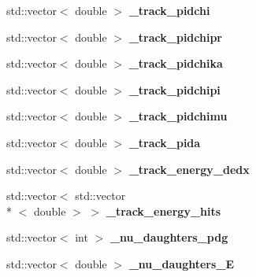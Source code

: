 \begin{DoxyCompactItemize}
\item 
\hypertarget{group__lee_gad41a5c8f9908d57ca71dafdd1acffa77}{std\-::vector$<$ double $>$ {\bfseries \-\_\-track\-\_\-pidchi}}\label{group__lee_gad41a5c8f9908d57ca71dafdd1acffa77}

\item 
\hypertarget{group__lee_gaecf90a4b535a1eea4a2e46efaed73aee}{std\-::vector$<$ double $>$ {\bfseries \-\_\-track\-\_\-pidchipr}}\label{group__lee_gaecf90a4b535a1eea4a2e46efaed73aee}

\item 
\hypertarget{group__lee_gacd3a6086b23d0242a02a1aaafaa22f21}{std\-::vector$<$ double $>$ {\bfseries \-\_\-track\-\_\-pidchika}}\label{group__lee_gacd3a6086b23d0242a02a1aaafaa22f21}

\item 
\hypertarget{group__lee_gaecc3128a6d2e1ce777b2a47cf8d8592e}{std\-::vector$<$ double $>$ {\bfseries \-\_\-track\-\_\-pidchipi}}\label{group__lee_gaecc3128a6d2e1ce777b2a47cf8d8592e}

\item 
\hypertarget{group__lee_ga92b6e7aa446dda4b3fb5ef6a523417d3}{std\-::vector$<$ double $>$ {\bfseries \-\_\-track\-\_\-pidchimu}}\label{group__lee_ga92b6e7aa446dda4b3fb5ef6a523417d3}

\item 
\hypertarget{group__lee_ga51862c538bdadd1819aa4cc47f37daab}{std\-::vector$<$ double $>$ {\bfseries \-\_\-track\-\_\-pida}}\label{group__lee_ga51862c538bdadd1819aa4cc47f37daab}

\item 
\hypertarget{group__lee_ga548f84dc28b54f42d917780967237fbb}{std\-::vector$<$ double $>$ {\bfseries \-\_\-track\-\_\-energy\-\_\-dedx}}\label{group__lee_ga548f84dc28b54f42d917780967237fbb}

\item 
\hypertarget{group__lee_ga78b31424830aa3c041dbff599185c3bb}{std\-::vector$<$ std\-::vector\\*
$<$ double $>$ $>$ {\bfseries \-\_\-track\-\_\-energy\-\_\-hits}}\label{group__lee_ga78b31424830aa3c041dbff599185c3bb}

\item 
\hypertarget{group__lee_gaaacddd2332477a23f786ee4c854d3e61}{std\-::vector$<$ int $>$ {\bfseries \-\_\-nu\-\_\-daughters\-\_\-pdg}}\label{group__lee_gaaacddd2332477a23f786ee4c854d3e61}

\item 
\hypertarget{group__lee_gac1d71f8ed82068b3a02d9a37905bf195}{std\-::vector$<$ double $>$ {\bfseries \-\_\-nu\-\_\-daughters\-\_\-\-E}}\label{group__lee_gac1d71f8ed82068b3a02d9a37905bf195}


\end{DoxyCompactItemize}
